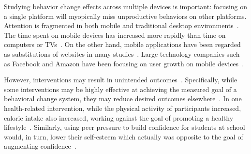 Studying behavior change effects across multiple devices is important: focusing on a single platform will myopically miss unproductive behaviors on other platforms. %
Attention is fragmented in both mobile and traditional desktop environments~\cite{socialmedia2010, mark2015multitasking}. The time spent on mobile devices has increased more rapidly than time on computers or TVs~\cite{multidevice, nielsen}. On the other hand, mobile applications have been regarded as substitutions of websites in many studies~\cite{10.1007/978-3-642-36516-4_7}. Large technology companies such as Facebook and Amazon have been focusing on user growth on mobile devices~\cite{socialmedia2010}.

However, interventions may result in unintended outcomes~\cite{trove.nla.gov.au/work/31391712, 10.1007/978-3-319-07127-5_11, 10.1007/978-3-319-31510-2_6}. Specifically, while some interventions may be highly effective at achieving the measured goal of a behavioral change system, they may reduce desired outcomes elsewhere~\cite{10.1007/978-3-319-07127-5_11}. In one health-related intervention, while the physical activity of participants increased, calorie intake also increased, working against the goal of promoting a healthy lifestyle~\cite{Blair1985}. Similarly, using peer pressure to build confidence for students at school would, in turn, lower their self-esteem which actually was opposite to the goal of augmenting confidence~\cite{10.1007/978-3-319-31510-2_6}.


